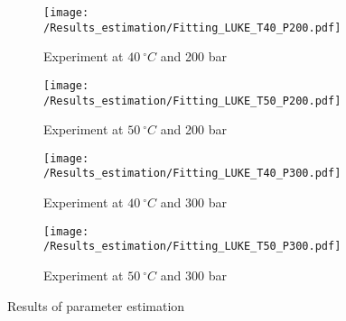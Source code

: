 \documentclass[../Article_Model_Parameters.tex]{subfiles}
\begin{document}
	\begin{figure}[!h]
		\centering
		\begin{subfigure}[b]{\columnwidth}
			\centering
			\texttt{[image: /Results\_estimation/Fitting\_LUKE\_T40\_P200.pdf]}
			\caption{Experiment at $40~^\circ C$ and 200 bar}
		\end{subfigure}
		\begin{subfigure}[b]{\columnwidth}
			\centering
			\texttt{[image: /Results\_estimation/Fitting\_LUKE\_T50\_P200.pdf]}
			\caption{Experiment at $50~^\circ C$ and 200 bar}
		\end{subfigure}
		\hfill
		\begin{subfigure}[b]{\columnwidth}
			\centering
			\texttt{[image: /Results\_estimation/Fitting\_LUKE\_T40\_P300.pdf]}
			\caption{Experiment at $40~^\circ C$ and 300 bar}
		\end{subfigure}
		\begin{subfigure}[b]{\columnwidth}
			\centering
			\texttt{[image: /Results\_estimation/Fitting\_LUKE\_T50\_P300.pdf]}
			\caption{Experiment at $50~^\circ C$ and 300 bar}
		\end{subfigure}
		\caption{Results of parameter estimation}
		\label{fig: estimation_results}
	\end{figure}
	
\end{document}
